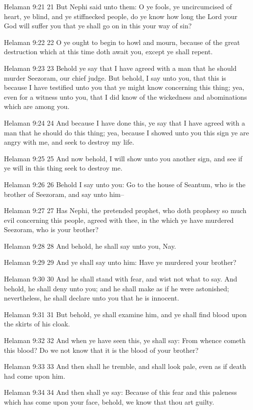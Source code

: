 Helaman 9:21
 21 But Nephi said unto them: O ye fools, ye uncircumcised of
heart, ye blind, and ye stiffnecked people, do ye know how long
the Lord your God will suffer you that ye shall go on in this
your way of sin?

Helaman 9:22
 22 O ye ought to begin to howl and mourn, because of the great
destruction which at this time doth await you, except ye shall
repent.

Helaman 9:23
 23 Behold ye say that I have agreed with a man that he should
murder Seezoram, our chief judge. But behold, I say unto you,
that this is because I have testified unto you that ye might know
concerning this thing; yea, even for a witness unto you, that I
did know of the wickedness and abominations which are among you.

Helaman 9:24
 24 And because I have done this, ye say that I have agreed with
a man that he should do this thing; yea, because I showed unto
you this sign ye are angry with me, and seek to destroy my life.

Helaman 9:25
 25 And now behold, I will show unto you another sign, and see if
ye will in this thing seek to destroy me.

Helaman 9:26
 26 Behold I say unto you: Go to the house of Seantum, who is the
brother of Seezoram, and say unto him--

Helaman 9:27
 27 Has Nephi, the pretended prophet, who doth prophesy so much
evil concerning this people, agreed with thee, in the which ye
have murdered Seezoram, who is your brother?

Helaman 9:28
 28 And behold, he shall say unto you, Nay.

Helaman 9:29
 29 And ye shall say unto him: Have ye murdered your brother?

Helaman 9:30
 30 And he shall stand with fear, and wist not what to say. And
behold, he shall deny unto you; and he shall make as if he were
astonished; nevertheless, he shall declare unto you that he is
innocent.

Helaman 9:31
 31 But behold, ye shall examine him, and ye shall find blood
upon the skirts of his cloak.

Helaman 9:32
 32 And when ye have seen this, ye shall say: From whence cometh
this blood? Do we not know that it is the blood of your brother?

Helaman 9:33
 33 And then shall he tremble, and shall look pale, even as if
death had come upon him.

Helaman 9:34
 34 And then shall ye say: Because of this fear and this paleness
which has come upon your face, behold, we know that thou art
guilty.

